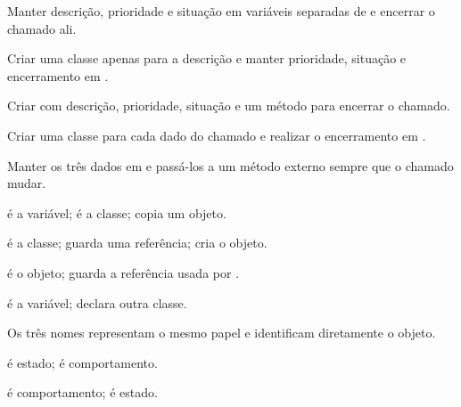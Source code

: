 \documentclass[11pt,a4paper]{article}
\begin{document}
\noindent\begin{minipage}[t]{.485\textwidth}
\begin{alternativas}
\item Manter descrição, prioridade e situação em variáveis separadas de  e encerrar o chamado ali.
\item Criar uma classe apenas para a descrição e manter prioridade, situação e encerramento em .
\item Criar  com descrição, prioridade, situação e um método para encerrar o chamado.
\item Criar uma classe para cada dado do chamado e realizar o encerramento em .
\item Manter os três dados em  e passá-los a um método externo sempre que o chamado mudar.
\end{alternativas}
\begin{alternativas}
\item {} é a variável;  é a classe;  copia um objeto.
\item {} é a classe;  guarda uma referência;  cria o objeto.
\item {} é o objeto;  guarda a referência usada por .
\item {} é a variável;  declara outra classe.
\item Os três nomes representam o mesmo papel e identificam diretamente o objeto.
\end{alternativas}
\begin{alternativas}
\item {} é estado;  é comportamento.
\item {} é comportamento;  é estado.

\end{alternativas}
\end{minipage}
\end{document}
